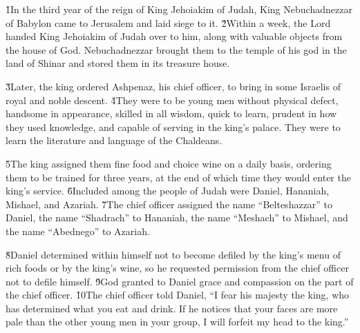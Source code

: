 


\v{1}In the third year of the reign of King Jehoiakim of Judah, King Nebuchadnezzar of Babylon came to Jerusalem and laid siege to it. \v{2}Within a week, the Lord handed King Jehoiakim of Judah over to him, along with valuable objects from the house of God. Nebuchadnezzar brought them to the temple of his god in the land of Shinar and stored them in its treasure house.

\v{3}Later, the king ordered Ashpenaz, his chief officer, to bring in some Israelis of royal and noble descent. \v{4}They were to be young men without physical defect, handsome in appearance, skilled in all wisdom, quick to learn, prudent in how they used knowledge, and capable of serving in the king's palace. They were to learn the literature and language of the Chaldeans.

\v{5}The king assigned them fine food and choice wine on a daily basis, ordering them to be trained for three years, at the end of which time they would enter the king's service. \v{6}Included among the people of Judah were Daniel, Hananiah, Mishael, and Azariah. \v{7}The chief officer assigned the name ``Belteshazzar'' to Daniel, the name ``Shadrach'' to Hananiah, the name ``Meshach'' to Mishael, and the name ``Abednego'' to Azariah.

\v{8}Daniel determined within himself not to become defiled by the king's menu of rich foods or by the king's wine, so he requested permission from the chief officer not to defile himself. \v{9}God granted to Daniel grace and compassion on the part of the chief officer. \v{10}The chief officer told Daniel, ``I fear his majesty the king, who has determined what you eat and drink. If he notices that your faces are more pale than the other young men in your group, I will forfeit my head to the king.''

